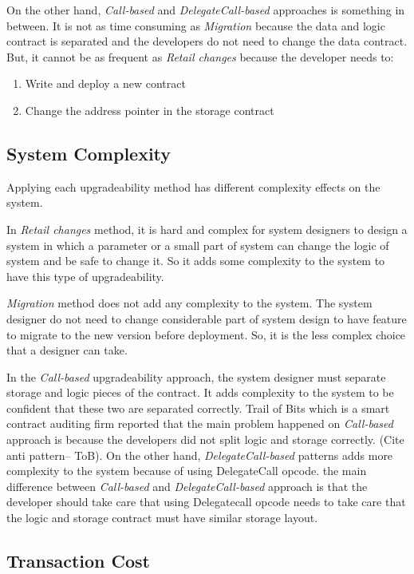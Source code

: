  On the other hand, \textit{Call-based} and \textit{DelegateCall-based} approaches is something in between. It is not as time consuming as \textit{Migration} because the data and logic contract is separated and the developers do not need to change the data contract. But, it cannot be as frequent as \textit{Retail changes} because the developer needs to:
 \begin{enumerate}
   \item Write and deploy a new contract
   \item Change the address pointer in the storage contract
 \end{enumerate}
 
 \subsection{System Complexity}
 Applying each upgradeability method has different complexity effects on the system. 

 In \textit{Retail changes} method, it is hard and complex for system designers to design a system in which a parameter or a small part of system can change the logic of system and be safe to change it. So it adds some complexity to the system to have this type of upgradeability.
 
 \textit{Migration} method does not add any complexity to the system. The system designer do not need to change considerable part of system design to have feature to migrate to the new version before deployment. So, it is the less complex choice that a designer can take.
 
 In the \textit{Call-based} upgradeability approach, the system designer must separate storage and logic pieces of the contract. It adds complexity to the system to be confident that these two are separated correctly. Trail of Bits which is a smart contract auditing firm reported that the main problem happened on \textit{Call-based} approach is because the developers did not split logic and storage correctly. (Cite anti pattern-- ToB). On the other hand, \textit{DelegateCall-based} patterns adds more complexity to the system because of using DelegateCall opcode. the main difference between \textit{Call-based} and \textit{DelegateCall-based} approach is that the developer should take care that using Delegatecall opcode needs to take care that the logic and storage contract must have similar storage layout. 

 \subsection{Transaction Cost}
 
